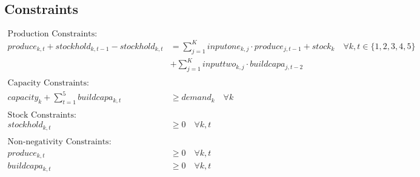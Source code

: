 \documentclass{article}
\begin{document}
\subsection*{Constraints}
\begin{align}
\text{Production Constraints:} & \\
produce_{k, t} + stockhold_{k, t-1} - stockhold_{k, t} & = \sum_{j=1}^{K} inputone_{k, j} \cdot produce_{j, t-1} + stock_{k} \quad \forall k, t \in \{1, 2, 3, 4, 5\} \\
& + \sum_{j=1}^{K} inputtwo_{k, j} \cdot buildcapa_{j, t-2} \\
\\
\text{Capacity Constraints:} & \\
capacity_{k} + \sum_{t=1}^{5} buildcapa_{k, t} & \geq demand_{k} \quad \forall k \\
\\
\text{Stock Constraints:} & \\
stockhold_{k, t} & \geq 0 \quad \forall k, t \\
\\
\text{Non-negativity Constraints:} & \\
produce_{k, t} & \geq 0 \quad \forall k, t \\
buildcapa_{k, t} & \geq 0 \quad \forall k, t \\
\end{align}
\end{document}
